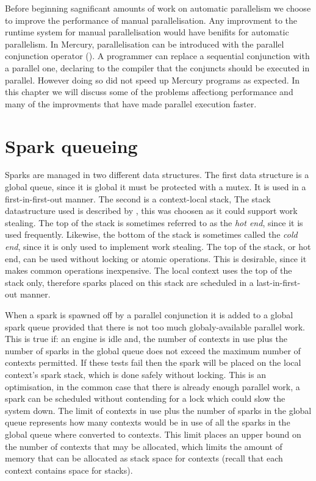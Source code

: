 

Before beginning sagnificant amounts of work on automatic parallelism we
choose to improve the performance of manual parallelisation.
Any improvment to the runtime system for manual parallelisation would have
benifits for automatic parallelism.
In Mercury, parallelisation can be introduced with the parallel conjunction
operator (\code{\&}).
A programmer can replace a sequential conjunction with a parallel one,
declaring to the compiler that the conjuncts should be executed in parallel.
However doing so did not speed up Mercury programs as expected.
In this chapter we will discuss
some of the problems affectiong performance and
many of the improvments that have made parallel execution faster.

\section{Spark queueing}

Sparks are managed in two different data structures.
The first data structure is a global queue,
since it is global it must be protected with a mutex.
It is used in a first-in-first-out manner.
The second is a context-local stack,
The stack datastructure used is described by \citet{workstealing_queue},
this was choosen as it could support work stealing.
The top of the stack is sometimes referred to as the \emph{hot end},
since it is used frequently.
Likewise, the bottom of the stack is sometimes called the
\emph{cold end}, since it is only used to implement work stealing.
The top of the stack, or hot end, can be used without locking or atomic
operations.
This is desirable, since it makes common operations inexpensive.
The local context uses the top of the stack only,
therefore sparks placed on this stack are scheduled in a
last-in-first-out manner.

When a spark is spawned off by a parallel conjunction
it is added to a global spark queue provided that there is not too much
globaly-available parallel work.
This is true if:
an engine is idle and,
the number of contexts in use plus the number of sparks in the global queue
does not exceed the maximum number of contexts permitted.
If these tests fail then the spark will be placed on the local context's
spark stack,
which is done safely without locking.
This is an optimisation,
in the common case that there is already enough parallel work,
a spark can be scheduled without contending for a lock which could slow the
system down.
The limit of contexts in use plus the number of sparks in the global queue
represents how many contexts would be in use of all the sparks in the global
queue where converted to contexts.
This limit places an upper bound on the number of contexts that may be
allocated,
which limits the amount of memory that can be allocated as stack space for
contexts
(recall that each context contains space for stacks).

